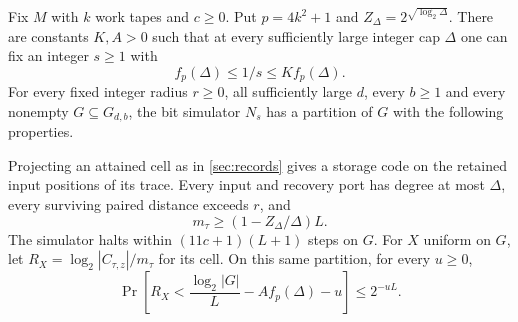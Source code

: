 \begin{theorem}\label{thm:native-tail}
Fix $M$ with $k$ work tapes and $c\ge0$. Put $p=4k^2+1$ and
$Z_\Delta=2^{\sqrt{\log_2\Delta}}$. There are constants $K,A>0$ such
that at every sufficiently large integer cap $\Delta$ one can fix
an integer $s\ge1$ with
\[
       f_p(\Delta)\le 1/s\le K f_p(\Delta).
\]
For every fixed integer radius $r\ge0$, all sufficiently large $d$,
every $b\ge1$ and every nonempty $G\subseteq G_{d,b}$, the bit simulator
$N_s$ has a partition of $G$ with the following properties.

Projecting an attained cell as in \cref{sec:records} gives a storage code
on the retained input positions of its trace. Every
input and recovery port has degree at most $\Delta$, every surviving paired distance
exceeds $r$, and
\[
               m_\tau\ge (1-Z_\Delta/\Delta)L .
\]
The simulator halts within $(11c+1)(L+1)$ steps on $G$. For $X$ uniform
on $G$, let $R_X=\log_2|C_{\tau,z}|/m_\tau$ for its cell.
On this same partition, for every $u\ge0$,
\[
 \Pr\!\left[R_X<\frac{\log_2|G|}{L}-A f_p(\Delta)-u\right]
      \le 2^{-uL}.
\]
\end{theorem}
